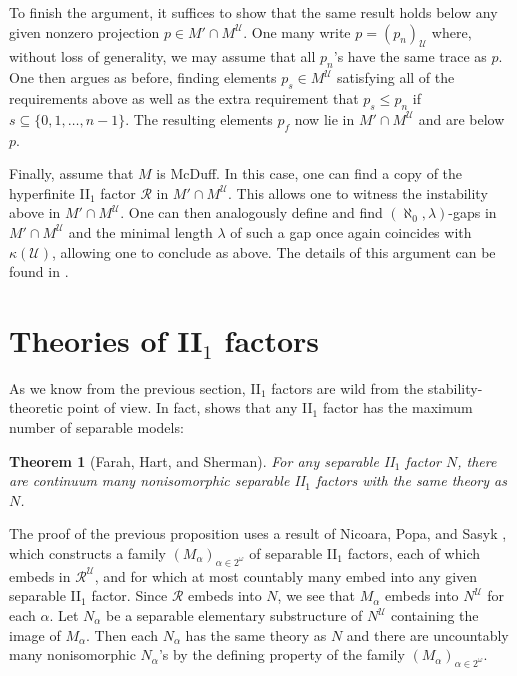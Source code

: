 \documentclass[12pt]{amsart}
\newtheorem{thm}{Theorem}[section]
\theoremstyle{definition}
\def\cal{\mathcal}
\def\u{\mathsf 1}
\def \R{\mathcal R}
\def \u{\mathcal U}
\begin{document}
To finish the argument, it suffices to show that the same result holds below any given nonzero projection $p\in M'\cap M^\u$.  One many write $p=(p_n)_\u$ where, without loss of generality, we may assume that all $p_n$'s have the same trace as $p$.  One then argues as before, finding elements $p_s\in M^\u$ satisfying all of the requirements above as well as the extra requirement that $p_s\leq p_n$ if $s\subseteq \{0,1,\ldots,n-1\}$.  The resulting elements $p_f$ now lie in $M'\cap M^\u$ and are below $p$. 

Finally, assume that $M$ is McDuff.  In this case, one can find a copy of the hyperfinite II$_1$ factor $\cal R$ in $M'\cap M^\u$.  This allows one to witness the instability above in $M'\cap M^\u$.  One can then analogously define and find $(\aleph_0,\lambda)$-gaps in $M'\cap M^\u$ and the minimal length $\lambda$ of such a gap once again coincides with $\kappa(\u)$, allowing one to conclude as above.  The details of this argument can be found in \cite[Proposition 2.9]{mtoa1}.


\section{Theories of II$_1$ factors}

As we know from the previous section, II$_1$ factors are wild from the stability-theoretic point of view.  In fact, \cite[Theorem 4.3]{mtoa3} shows that any II$_1$ factor has the maximum number of separable models:

\begin{thm}[Farah, Hart, and Sherman]\label{manymodels}
For any separable II$_1$ factor $N$, there are continuum many nonisomorphic separable II$_1$ factors with the same theory as $N$.
\end{thm}

The proof of the previous proposition uses a result of Nicoara, Popa, and Sasyk \cite{NPS}, which constructs a family $(M_\alpha)_{\alpha\in 2^\omega}$ of separable II$_1$ factors, each of which embeds in $\R^\u$, and for which at most countably many embed into any given separable II$_1$ factor.  Since $\R$ embeds into $N$, we see that $M_\alpha$ embeds into $N^\u$ for each $\alpha$.  Let $N_\alpha$ be a separable elementary substructure of $N^\u$ containing the image of $M_\alpha$.  Then each $N_\alpha$ has the same theory as $N$ and there are uncountably many nonisomorphic $N_\alpha$'s by the defining property of the family $(M_\alpha)_{\alpha\in 2^\omega}$.
\end{document}
